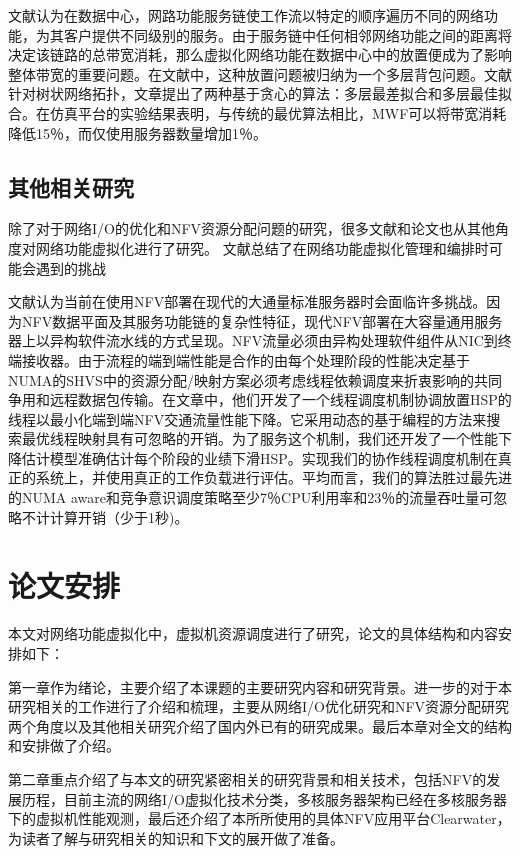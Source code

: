 文献认为在数据中心，网路功能服务链使工作流以特定的顺序遍历不同的网络功能，为其客户提供不同级别的服务。由于服务链中任何相邻网络功能之间的距离将决定该链路的总带宽消耗，那么虚拟化网络功能在数据中心中的放置便成为了影响整体带宽的重要问题。在文献中，这种放置问题被归纳为一个多层背包问题。文献针对树状网络拓扑，文章提出了两种基于贪心的算法：多层最差拟合和多层最佳拟合。在仿真平台的实验结果表明，与传统的最优算法相比，MWF可以将带宽消耗降低15％，而仅使用服务器数量增加1％。	


\subsection{其他相关研究}
除了对于网络I/O的优化和NFV资源分配问题的研究，很多文献和论文也从其他角度对网络功能虚拟化进行了研究。
文献总结了在网络功能虚拟化管理和编排时可能会遇到的挑战


文献认为当前在使用NFV部署在现代的大通量标准服务器时会面临许多挑战。因为NFV数据平面及其服务功能链的复杂性特征，现代NFV部署在大容量通用服务器上以异构软件流水线的方式呈现。NFV流量必须由异构处理软件组件从NIC到终端接收器。由于流程的端到端性能是合作的由每个处理阶段的性能决定基于NUMA的SHVS中的资源分配/映射方案必须考虑线程依赖调度来折衷影响的共同争用和远程数据包传输。在文章中，他们开发了一个线程调度机制协调放置HSP的线程以最小化端到端NFV交通流量性能下降。它采用动态的基于编程的方法来搜索最优线程映射具有可忽略的开销。为了服务这个机制，我们还开发了一个性能下降估计模型准确估计每个阶段的业绩下滑HSP。实现我们的协作线程调度机制在真正的系统上，并使用真正的工作负载进行评估。平均而言，我们的算法胜过最先进的NUMA aware和竞争意识调度策略至少7％CPU利用率和23％的流量吞吐量可忽略不计计算开销（少于1秒)。

\section{论文安排}
本文对网络功能虚拟化中，虚拟机资源调度进行了研究，论文的具体结构和内容安排如下：

第一章作为绪论，主要介绍了本课题的主要研究内容和研究背景。进一步的对于本研究相关的工作进行了介绍和梳理，主要从网络I/O优化研究和NFV资源分配研究两个角度以及其他相关研究介绍了国内外已有的研究成果。最后本章对全文的结构和安排做了介绍。

第二章重点介绍了与本文的研究紧密相关的研究背景和相关技术，包括NFV的发展历程，目前主流的网络I/O虚拟化技术分类，多核服务器架构已经在多核服务器下的虚拟机性能观测，最后还介绍了本所所使用的具体NFV应用平台Clearwater，为读者了解与研究相关的知识和下文的展开做了准备。

